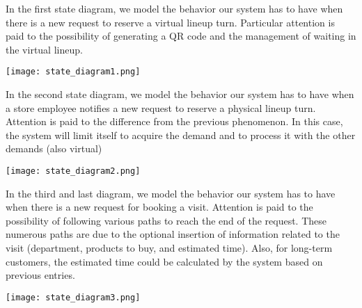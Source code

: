 \medskip
In the first state diagram, we model the behavior our system has to have when there is a new request to reserve a virtual lineup turn. Particular attention is paid to the possibility of generating a QR code and the management of waiting in the virtual lineup.

\medskip
\texttt{[image: state\_diagram1.png]}

\medskip
In the second state diagram, we model the behavior our system has to have when a store employee notifies a new request to reserve a physical lineup turn. Attention is paid to the difference from the previous phenomenon. In this case, the system will limit itself to acquire the demand and to process it with the other demands (also virtual)

\medskip
\texttt{[image: state\_diagram2.png]}

\medskip
In the third and last diagram, we model the behavior our system has to have when there is a new request for booking a visit. Attention is paid to the possibility of following various paths to reach the end of the request. These numerous paths are due to the optional insertion of information related to the visit (department, products to buy, and estimated time). Also, for long-term customers, the estimated time could be calculated by the system based on previous entries.

\texttt{[image: state\_diagram3.png]}